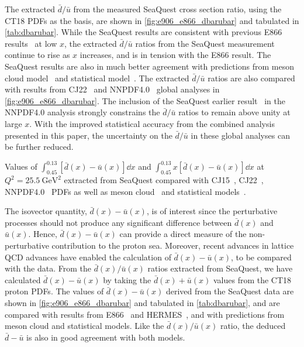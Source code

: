 \documentclass[reprint,aps,unsortedaddress,superscriptaddress,prl,floatfix,showpacs,linenumbers]{revtex4-2}
\begin{document}
The extracted $\bar{d}/\bar{u}$ from the measured SeaQuest cross section ratio,
using the CT18 PDFs as the basis, are shown in \cref{fig:e906_e866_dbarubar}
and tabulated in \cref{tab:dbarubar}.
While the SeaQuest results are consistent with previous E866 
results~\cite{towell2001} at low $x$,
the extracted $\bar{d}/\bar{u}$ ratios from the SeaQuest measurement 
continue to rise as $x$ increases,
and is in tension with the E866 result.
The SeaQuest results are also in much better agreement with 
predictions from meson cloud model~\cite{alberg2022}
and statistical model~\cite{soffer2019}.
The extracted $\bar{d}/\bar{u}$ ratios are also compared with results 
from CJ22~\cite{accardi2023} and NNPDF4.0~\cite{ball2022a}
global analyses in \cref{fig:e906_e866_dbarubar}.
The inclusion of the SeaQuest earlier result~\cite{dove2021} in the 
NNPDF4.0 analysis strongly constrains the $\bar{d}/\bar{u}$ ratios
to remain above unity at large $x$.
With the improved statistical accuracy from the combined analysis 
presented in this paper, the uncertainty on the $\bar{d}/\bar{u}$ in 
these global analyses can be further reduced.


\begin{table}[htbp!]
	\centering
	\caption{Values of $\int_{0.45}^{0.13} \left[\bar{d}\left(x\right) - \bar{u}\left(x\right)\right] \dd{x}$
		and $\int_{0.45}^{0.13} x\left[\bar{d}\left(x\right) - \bar{u}\left(x\right)\right] \dd{x}$ at $Q^2=\SI{25.5}{\GeV\squared}$ extracted from
		SeaQuest compared with CJ15~\cite{accardi2016a}, CJ22~\cite{accardi2023}, NNPDF4.0~\cite{ball2022a}
		PDFs as well as meson cloud~\cite{alberg2022} and statistical models~\cite{soffer2019}.}
	\label{tab:dbarMubar}
	\begin{adjustbox}{max width=\textwidth}
		
	\end{adjustbox}
\end{table}

The isovector quantity, $\bar{d}(x) - \bar{u}(x)$,
is of interest since the perturbative processes should not produce any significant difference between $\bar{d}(x)$ and $\bar{u}(x)$.
Hence, $\bar{d}(x) - \bar{u}(x)$ can provide a direct measure of the non-perturbative contribution to the proton sea.
Moreover, recent advances in lattice QCD advances have enabled the calculation of $\bar{d}(x) - \bar{u}(x)$, to be compared with the data.
From the $\bar{d}(x) / \bar{u}(x)$ ratios extracted from SeaQuest,
we have calculated $\bar{d}(x) - \bar u(x)$ by taking the $\bar{d}(x) + \bar{u}(x)$ values from the CT18 proton PDFs. 
The values of $\bar{d}(x)-\bar{u}(x)$ derived from the SeaQuest data are 
shown in \cref{fig:e906_e866_dbarubar} and tabulated in \cref{tab:dbarubar},
and are compared with results from E866~\cite{towell2001} and 
HERMES~\cite{ackerstaff1998}, and with predictions from meson cloud and statistical models.
Like the $\bar{d}(x) / \bar{u}(x)$ ratio, the deduced $\bar{d}-\bar{u}$ is also in good agreement with both models.
\end{document}
